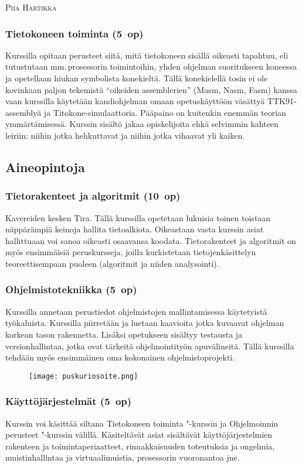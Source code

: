 \documentclass[../ala_hataile.tex]{subfiles}
\begin{document}
	\vspace{0.5cm}
	\noindent\textsc{Piia Hartikka}
	
	\subsubsection*{Tietokoneen toiminta (5~op)}
	Kurssilla opitaan perusteet siitä, mitä tietokoneen sisällä oikeasti tapahtuu, eli tutustutaan mm.\,prosessorin toimintoihin, yhden ohjelman suoritukseen koneessa ja opetellaan hiukan symbolista kone\-kieltä. Tällä kone\-kielellä tosin ei ole kovinkaan paljon tekemistä ``oikeiden assemblerien'' (Masm, Nasm, Fasm) kanssa vaan kurssilla käytetään kandi\-ohjelman omaan opetus\-käyttöön väsättyä TTK91-assemblyä ja Titokone-simulaattoria. Pääpaino on kuitenkin enemmän teorian ymmärtämisessä. Kurssin sisältö jakaa opiskelijoita ehkä selvimmin kahteen leiriin: niihin jotka hehkuttavat ja niihin jotka vihaavat yli kaiken.
	
	\subsection*{Aineopintoja}
	\subsubsection*{Tietorakenteet ja algoritmit (10~op)}
	Kavereiden kesken Tira. Tällä kurssilla opetetaan lukuisia toinen toistaan näppärämpiä keinoja hallita tieto\-alkiota. Oikeastaan vasta kurssin asiat hallittuaan voi sanoa oikeasti osaavansa koodata. Tieto\-rakenteet ja algoritmit on myös ensimmäisiä peruskursseja, joilla kurkistetaan tietojen\-käsittelyn teoreettisempaan puoleen (algoritmit ja niiden analysointi). 
	\subsubsection*{Ohjelmistotekniikka (5~op)}
	Kurssilla annetaan perustiedot ohjelmistojen mallintamisessa käytetyistä työkaluista. Kurssilla piirretään ja luetaan kaavioita jotka kuvaavat ohjelman korkean tason rakennetta. Lisäksi opetukseen sisältyy testausta ja versionhallintaa, jotka ovat tärkeitä ohjelmointityön apuvälineitä. Tällä kurssilla tehdään myös ensimmäinen oma kokonainen ohjelmistoprojekti.
	\begin{figure}
		\centering
		\texttt{[image: puskuriosoite.png]}
	\end{figure}
	
	\subsubsection*{Käyttöjärjestelmät (5~op)}
	Kurssin voi käsittää siltana Tietokoneen toiminta "-kurssin ja Ohjelmoinnin perusteet "-kurssin välillä. Käsiteltävät asiat sisältävät käyttö\-järjestelmien rakenteen ja toimintaperiaatteet, rinnakkaisuuden toteutuksia ja ongelmia, muistinhallintaa ja virtuaalimuistia, prosessorin vuoronantoa jne.
	
\end{document}
